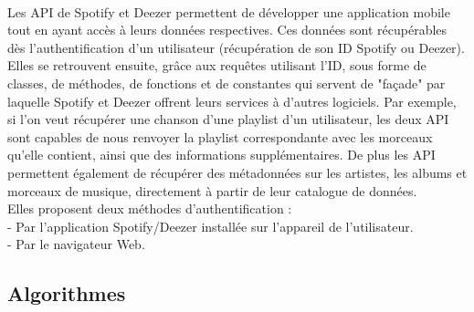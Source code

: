 \documentclass[12pt, openany]{report}
\begin{document}
\paragraph{}Les API de Spotify \cite{APISpotify} et Deezer \cite{APIDeezer} permettent de développer une application mobile tout en ayant accès à leurs données respectives. Ces données sont récupérables dès l'authentification d'un utilisateur (récupération de son ID Spotify ou Deezer). Elles se retrouvent ensuite, grâce aux requêtes utilisant l'ID, sous forme de classes, de méthodes, de fonctions et de constantes qui servent de "façade" par laquelle Spotify et Deezer offrent leurs services à d'autres logiciels. Par exemple, si l'on veut récupérer une chanson d'une playlist d'un utilisateur, les deux API sont capables de nous renvoyer la playlist correspondante avec les morceaux qu'elle contient, ainsi que des informations supplémentaires. De plus les API permettent également de récupérer des métadonnées
sur les artistes, les albums et morceaux de musique, directement à partir de leur catalogue de données.
\\
Elles proposent deux méthodes d'authentification :
\\- Par l'application Spotify/Deezer installée sur l'appareil de l'utilisateur.
\\- Par le navigateur Web.

\subsection{Algorithmes}
\end{document}
